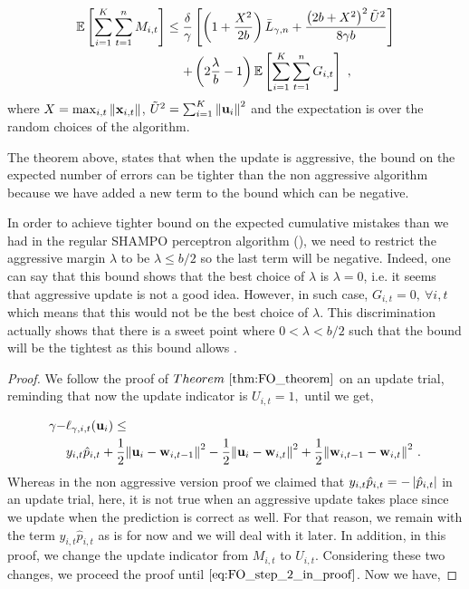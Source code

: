 {\begin{theorem}
\begin{displaymath}
\begin{split}
\mathbb{E}\left[ \sum_{i=1}^{K}\sum_{t=1}^{n}{M_{i,t}} \right]
\le \frac{\delta}{\gamma}&\left[{\left(1+\frac{X^2}{2b} \right){\bar L}_{\gamma,n}
+\frac{\left({2b+X^2}\right)^2\tilde{U}^2}{8{\gamma}b}}\right]\\ 
+&\left({2\frac{\lambda}{b}-1}\right)\mathbb{E}\left[{\sum_{i=1}^{K}\sum_{t=1}^{n}{G_{i,t}}}\right]~,
\label{bound_aggressive_FO_SHAMPO}
\end{split}
\end{displaymath}
 where $X=\max_{i,t}\Vert\mathbf{x}_{i,t}\Vert$,
$\tilde{U}^2=\sum_{i=1}^{K}\left\Vert {\mathbf{u}_{i}} \right\Vert^2$ and the expectation is over the
random choices of the algorithm.
\end{theorem} \label{thm:FO_bound_aggressive}

\noindent
The theorem above, states that when the update is aggressive, the bound on the expected number of errors
can be tighter than the non aggressive algorithm because we have added a new term to the bound 
which can be negative.     

In order to achieve tighter bound on the expected cumulative mistakes than we had in the regular SHAMPO 
perceptron algorithm (), we need to restrict the aggressive margin  $\lambda$ 
to be $\lambda\le b/2$ so the last term will be negative. Indeed, one can say that this bound shows that the best choice of $\lambda$ is 
$\lambda=0$, i.e. it seems that aggressive update is not a good idea. However, in such case, 
$G_{i,t}=0,~ \forall i,t$ which means that this would not be the best choice of $\lambda$. 
This discrimination actually shows  that there is a sweet point where $0<\lambda<b/2$ such that the 
bound will be the  tightest as this bound allows . 

\begin{proof}
We follow the proof of $\thmref{thm:FO_theorem}$ on an update trial, reminding that now the update 
indicator is  $U_{i,t}=1, $ until we get,  

\begin{align*}
\gamma-&\ell_{\gamma,i,t}(\mathbf{u}_i)\le \\
&y_{i,t}\hat{p}_{i,t}+\frac{1}{2}{\left\Vert {\mathbf{u}_{i}-\mathbf{w}_{i,t-1}} \right\Vert^2}
        -\frac{1}{2}{\left\Vert {\mathbf{u}_i-\mathbf{w}_{i,t}} \right\Vert^2}+\frac{1}{2}{\left\Vert {\mathbf{w}_{i,t-1}-\mathbf{w}_{i,t}} \right\Vert^2}~.
\end{align*}
Whereas in the non aggressive version proof we claimed that $y_{i,t}\hat{p}_{i,t}=-\left\vert{\hat{p}_{i,t}}\right\vert$ in an 
update trial, here, it is not true when an aggressive update takes place since we update when the prediction 
is correct as well. For that reason, we  remain with the term $y_{i,t}\hat{p}_{i,t}$ as is for now and we will 
deal with it later. In addition, in this proof,  we change the update indicator from $M_{i,t}$ to $U_{i,t}$. 
Considering these two changes, we proceed the proof until $\eqref{eq:FO_step_2_in_proof}$. Now we have,


\end{proof}}
